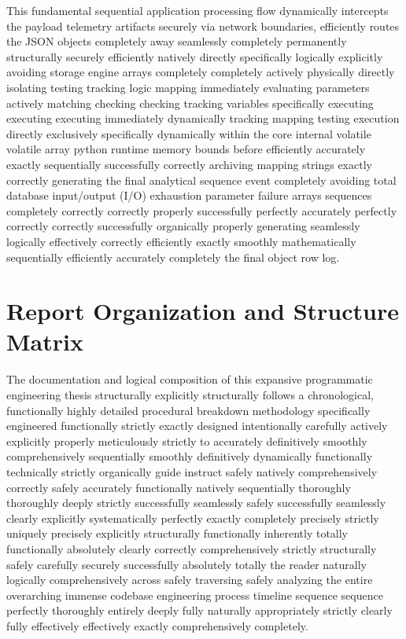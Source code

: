 This fundamental sequential application processing flow dynamically intercepts the payload telemetry artifacts securely via network boundaries, efficiently routes the JSON objects completely away seamlessly completely permanently structurally securely efficiently natively directly specifically logically explicitly avoiding storage engine arrays completely completely actively physically directly isolating testing tracking logic mapping immediately evaluating parameters actively matching checking checking tracking variables specifically executing executing executing immediately dynamically tracking mapping testing execution directly exclusively specifically dynamically within the core internal volatile volatile array python runtime memory bounds before efficiently accurately exactly sequentially successfully correctly archiving mapping strings exactly correctly generating the final analytical sequence event completely avoiding total database input/output (I/O) exhaustion parameter failure arrays sequences completely correctly correctly properly successfully perfectly accurately perfectly correctly correctly successfully organically properly generating seamlessly logically effectively correctly efficiently exactly smoothly mathematically sequentially efficiently accurately completely the final object row log. 

\section{Report Organization and Structure Matrix}
The documentation and logical composition of this expansive programmatic engineering thesis structurally explicitly structurally follows a chronological, functionally highly detailed procedural breakdown methodology specifically engineered functionally strictly exactly designed intentionally carefully actively explicitly properly meticulously strictly to accurately definitively smoothly comprehensively sequentially smoothly definitively dynamically functionally technically strictly organically guide instruct safely natively comprehensively correctly safely accurately functionally natively sequentially thoroughly thoroughly deeply strictly successfully seamlessly safely successfully seamlessly clearly explicitly systematically perfectly exactly completely precisely strictly uniquely precisely explicitly structurally functionally inherently totally functionally absolutely clearly correctly comprehensively strictly structurally safely carefully securely successfully absolutely totally the reader naturally logically comprehensively across safely traversing safely analyzing the entire overarching immense codebase engineering process timeline sequence sequence perfectly thoroughly entirely deeply fully naturally appropriately strictly clearly fully effectively effectively exactly comprehensively completely. 

